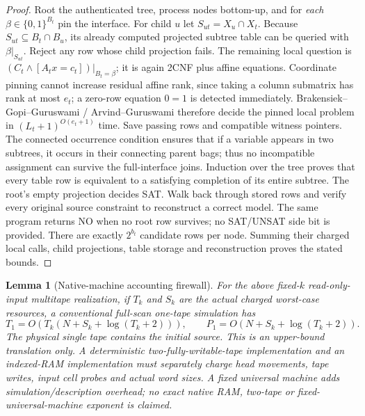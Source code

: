 \documentclass[11pt]{article}
\newtheorem{lemma}[theorem]{Lemma}
\begin{document}
\begin{proof}
Root the authenticated tree, process nodes bottom-up, and for \emph{each} $\beta\in\{0,1\}^{B_t}$ pin the interface. For child $u$ let $S_{ut}=X_u\cap X_t$. Because $S_{ut}\subseteq B_t\cap B_u$, its already computed projected subtree table can be queried with $\beta|_{S_{ut}}$. Reject any row whose child projection fails. The remaining local question is $(C_t\wedge[A_tx=c_t])|_{B_t=\beta}$; it is again 2CNF plus affine equations. Coordinate pinning cannot increase residual affine rank, since taking a column submatrix has rank at most $e_t$; a zero-row equation $0=1$ is detected immediately. Brakensiek--Gopi--Guruswami / Arvind--Guruswami therefore decide the pinned local problem in $(L_t+1)^{O(e_t+1)}$ time. Save passing rows and compatible witness pointers. The connected occurrence condition ensures that if a variable appears in two subtrees, it occurs in their connecting parent bags; thus no incompatible assignment can survive the full-interface joins. Induction over the tree proves that every table row is equivalent to a satisfying completion of its entire subtree. The root's empty projection decides SAT. Walk back through stored rows and verify every original source constraint to reconstruct a correct model. The same program returns NO when no root row survives; no SAT/UNSAT side bit is provided. There are exactly $2^{b_t}$ candidate rows per node. Summing their charged local calls, child projections, table storage and reconstruction proves the stated bounds.
\end{proof}
\begin{lemma}[Native-machine accounting firewall]
For the above fixed-$k$ read-only-input multitape realization, if $T_k$ and $S_k$ are the actual charged worst-case resources, a conventional full-scan one-tape simulation has
\[
T_1=O\!\left(T_k(N+S_k+\log(T_k+2))\right),\qquad P_1=O(N+S_k+\log(T_k+2)).
\]
The physical single tape contains the initial source. This is an \emph{upper-bound translation only}. A deterministic two-fully-writable-tape implementation and an indexed-RAM implementation must separately charge head movements, tape writes, input cell probes and actual word sizes. A fixed universal machine adds simulation/description overhead; no exact native RAM, two-tape or fixed-universal-machine exponent is claimed.
\end{lemma}
\end{document}
